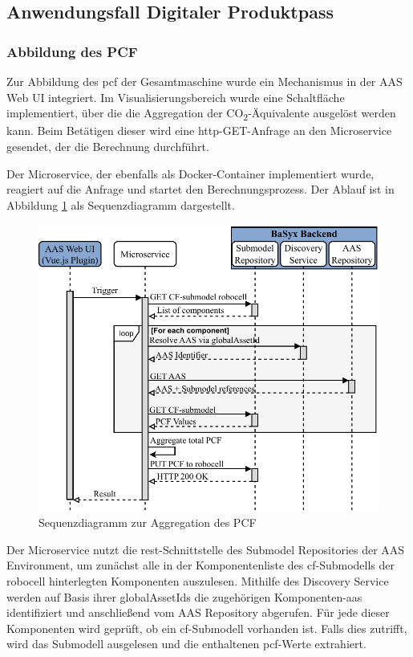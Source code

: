 \newpage
\subsection{Anwendungsfall Digitaler Produktpass}
\subsubsection{Abbildung des PCF}
Zur Abbildung des \acs{pcf} der Gesamtmaschine wurde ein Mechanismus in der AAS Web UI integriert. 
Im Visualisierungsbereich wurde eine Schaltfläche implementiert, über die die Aggregation der CO\textsubscript{2}-Äquivalente ausgelöst werden kann. 
Beim Betätigen dieser wird eine \acs{http}-GET-Anfrage an den Microservice gesendet, der die Berechnung durchführt.

Der Microservice, der ebenfalls als Docker-Container implementiert wurde, reagiert auf die Anfrage und startet den Berechnungsprozess. 
Der Ablauf ist in Abbildung \ref{fig:SequenzdiagrammPCF} als Sequenzdiagramm dargestellt.

\begin{figure}[htbp]
    \centering
        \includegraphics[width=1\textwidth]{Bilder/Ergebnisse/DPP/AggregationNue.pdf}
    \caption{Sequenzdiagramm zur Aggregation des PCF}
    \label{fig:SequenzdiagrammPCF}
\end{figure}

Der Microservice nutzt die \acs{rest}-Schnittstelle des Submodel Repositories der AAS Environment, um zunächst alle in der Komponentenliste des \acs{cf}-Submodells der robocell hinterlegten Komponenten auszulesen. 
Mithilfe des Discovery Service werden auf Basis ihrer globalAssetIds die zugehörigen Komponenten-\acs{aas} identifiziert und anschließend vom AAS Repository abgerufen.
Für jede dieser Komponenten wird geprüft, ob ein \acs{cf}-Submodell vorhanden ist. 
Falls dies zutrifft, wird das Submodell ausgelesen und die enthaltenen \acs{pcf}-Werte extrahiert.

